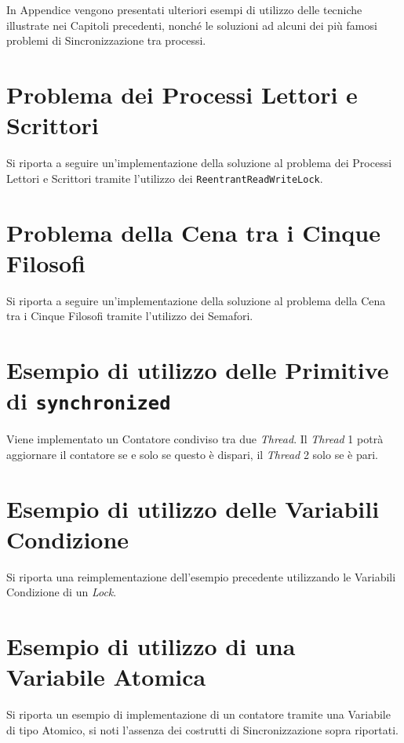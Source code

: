 In Appendice vengono presentati ulteriori esempi di utilizzo delle tecniche illustrate nei Capitoli precedenti, nonché le soluzioni ad alcuni dei più famosi problemi di Sincronizzazione tra processi.

\section{Problema dei Processi Lettori e Scrittori} \label{appendix:ReadersAndWriters}
Si riporta a seguire un'implementazione della soluzione al problema dei Processi Lettori e Scrittori tramite l'utilizzo dei \texttt{ReentrantReadWriteLock}.


\section{Problema della Cena tra i Cinque Filosofi} \label{appendix:FivePhilosophers}
Si riporta a seguire un'implementazione della soluzione al problema della Cena tra i Cinque Filosofi tramite l'utilizzo dei Semafori.


\section{Esempio di utilizzo delle Primitive di \texttt{synchronized}} \label{appendix:AlternateCounterSynchronized}
Viene implementato un Contatore condiviso tra due \textit{Thread}. Il \textit{Thread} 1 potrà aggiornare il contatore se e solo se questo è dispari, il \textit{Thread} 2 solo se è pari.


\section{Esempio di utilizzo delle Variabili Condizione} \label{appendix:AlternateCounterConditionVars}
Si riporta una reimplementazione dell'esempio precedente utilizzando le Variabili Condizione di un \textit{Lock}.


\section{Esempio di utilizzo di una Variabile Atomica} \label{appendix:AtomicVarExample}
Si riporta un esempio di implementazione di un contatore tramite una Variabile di tipo Atomico, si noti l'assenza dei costrutti di Sincronizzazione sopra riportati.
